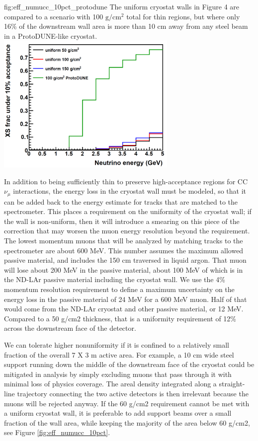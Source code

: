\begin{dunefigure}{fig:eff_numucc_10pct_protodune}
{The uniform cryostat walls in Figure 4 are compared to a scenario with 100 $\mbox{g}/\mbox{cm}^2$ total for thin regions, but where only 16\% of the downstream wall area is more than 10 cm away from any steel beam in a ProtoDUNE-like cryostat.}
\includegraphics[width=0.65\textwidth]{graphics/cryostat/numu__cc_efficiency_10pct_protodune.png}
\end{dunefigure}


In addition to being sufficiently thin to preserve high-acceptance regions for CC $\nu_\mu$ interactions, the energy loss in the cryostat wall must be modeled, so that it can be added back to the energy estimate for tracks that are matched to the spectrometer. This places a requirement on the uniformity of the cryostat wall; if the wall is non-uniform, then it will introduce a smearing on this piece of the correction that may worsen the muon energy resolution beyond the requirement. The lowest momentum muons that will be analyzed by matching tracks to the spectrometer are about 600 MeV. This number assumes the maximum allowed passive material, and includes the 150 cm traversed in liquid argon. That muon will lose about 200 MeV in the passive material, about 100 MeV of which is in the ND-LAr passive material including the cryostat wall. We use the 4\% momentum resolution requirement to define a maximum uncertainty on the energy loss in the passive material of 24 MeV for a 600 MeV muon. Half of that would come from the ND-LAr cryostat and other passive material, or 12 MeV. Compared to a 50 g/cm2 thickness, that is a uniformity requirement of 12\% across the downstream face of the detector.

We can tolerate higher nonuniformity if it is confined to a relatively small fraction of the overall 7 X 3 m active area. For example, a 10 cm wide steel support running down the middle of the downstream face of the cryostat could be mitigated in analysis by simply excluding muons that pass through it with minimal loss of physics coverage. The areal density integrated along a straight-line trajectory connecting the two active detectors is then irrelevant because the muons will be rejected anyway. If the 60 g/cm2 requirement cannot be met with a uniform cryostat wall, it is preferable to add support beams over a small fraction of the wall area, while keeping the majority of the area below 60 g/cm2, see Figure \ref{fig:eff_numucc_10pct}.

